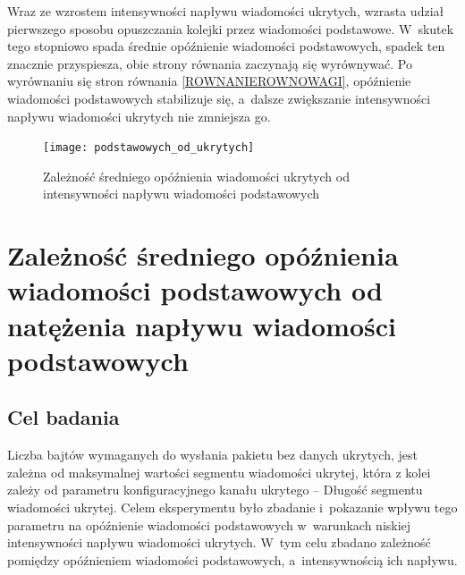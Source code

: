 \documentclass[a4paper, twoside, 12pt]{report}
\begin{document}
            Wraz ze wzrostem intensywności napływu wiadomości ukrytych, wzrasta udział
            pierwszego sposobu opuszczania kolejki przez wiadomości podstawowe.
            W~skutek tego stopniowo spada średnie opóźnienie wiadomości podstawowych,
            spadek ten znacznie przyspiesza, obie strony równania zaczynają się wyrównywać.
            Po wyrównaniu się stron równania \ref{ROWNANIEROWNOWAGI},
            opóźnienie wiadomości podstawowych stabilizuje się, a~dalsze zwiększanie
            intensywności napływu wiadomości ukrytych nie zmniejsza go.

        \begin{figure}[h]
                \centering
                \texttt{[image: podstawowych\_od\_ukrytych]}
                \caption{Zależność średniego opóźnienia wiadomości ukrytych od
                    intensywności napływu wiadomości podstawowych}
                \label{OPOZNIENIEPODSTAWOWYCHODUKRYTYCH}
        \end{figure}



    \section{Zależność średniego opóźnienia wiadomości podstawowych od natężenia napływu wiadomości podstawowych} \label{BADANIEDLUGOSCISEGMENTUDANYCHUKRYTYCH}
        \subsection{Cel badania}
            Liczba bajtów wymaganych do wysłania pakietu bez danych ukrytych,
            jest zależna od maksymalnej wartości segmentu wiadomości ukrytej, która
            z kolei zależy od parametru konfiguracyjnego kanału ukrytego -- Długość segmentu wiadomości ukrytej.
            Celem eksperymentu było zbadanie i~pokazanie wpływu tego parametru
            na opóźnienie wiadomości podstawowych w~warunkach niskiej intensywności
            napływu wiadomości ukrytych. W~tym celu zbadano zależność pomiędzy
            opóźnieniem wiadomości podstawowych, a~intensywnością ich napływu.
\end{document}
